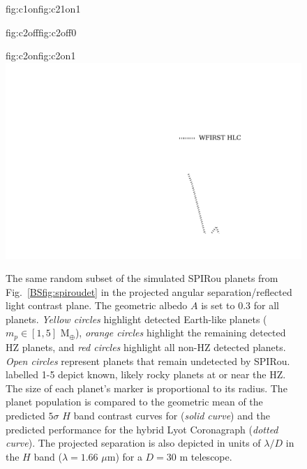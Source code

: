 \begin{figure}
\begin{ocg}{fig:c1on}{fig:c21on}{1}
  \end{ocg}
  \hspace{-0.99\hsize}%
  \begin{ocg}{fig:c2off}{fig:c2off}{0}%
  \end{ocg}%
  \begin{ocg}{fig:c2on}{fig:c2on}{1}%
   \includegraphics[width=0.99\hsize]{figures/SPIRoudet_contrast_curve2.png}%
  \end{ocg}
  \hspace{-0.99\hsize}%
  \caption[One realization of targetted and detected planets in the SLS-PS versus angular separation and reflected light contrast.]
      {\small The same random subset of the simulated SPIRou planets from Fig.~\ref{BSfig:spiroudet}
    in the projected angular separation/reflected light contrast plane. The geometric albedo $A$ is set
    to 0.3 for all planets. 
    \emph{Yellow circles} highlight detected Earth-like planets ($m_p \in [1,5]$ M$_{\oplus}$), \emph{orange circles}
    highlight the remaining detected HZ planets, and \emph{red circles} highlight all non-HZ detected planets. 
    \emph{Open circles} represent planets that remain undetected by SPIRou.
     labelled
    1-5 depict known, likely rocky planets at or near the HZ. 
    The size of each planet's marker is proportional to its radius.
    The planet population is compared to the geometric mean of the predicted $5\sigma$ $H$ band contrast curves for
     (\emph{solid curve}) and
    the predicted performance for the 
     hybrid Lyot Coronagraph (\emph{dotted curve}). The
    projected separation is also depicted in units of $\lambda /D$ in the $H$ band ($\lambda = 1.66$ $\mu$m) for a
    $D=30$ m telescope.}
  \label{BSfig:spirouimaging}
\end{figure}



